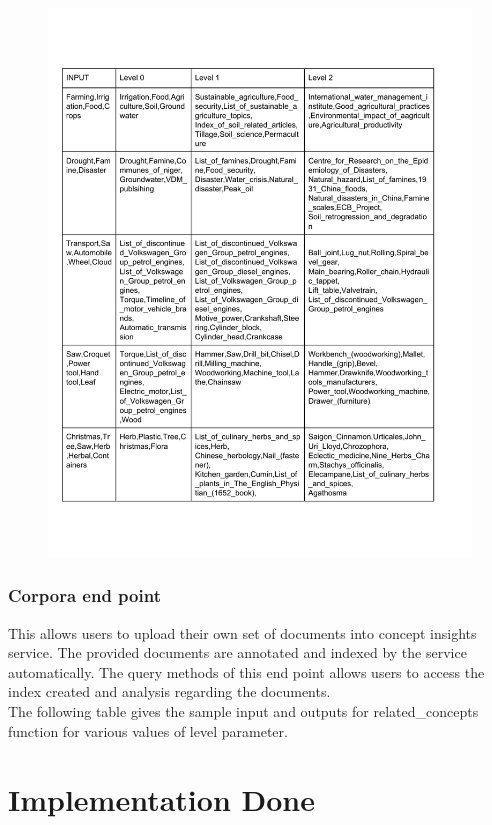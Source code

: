 \documentclass[12pt]{article}
\begin{document}
\begin{figure}
 \centering 
 \includegraphics{file.pdf}
\end{figure}

\subsubsection{Corpora end point}
This allows users to upload their own set of documents into concept insights service. The provided documents are annotated and indexed by the service automatically. The query methods of this end point allows users to access the index created and analysis regarding the documents.\\

The following table gives the sample input and outputs for related\_concepts function for various values of level parameter.

\newpage
\section{Implementation Done}
\end{document}
